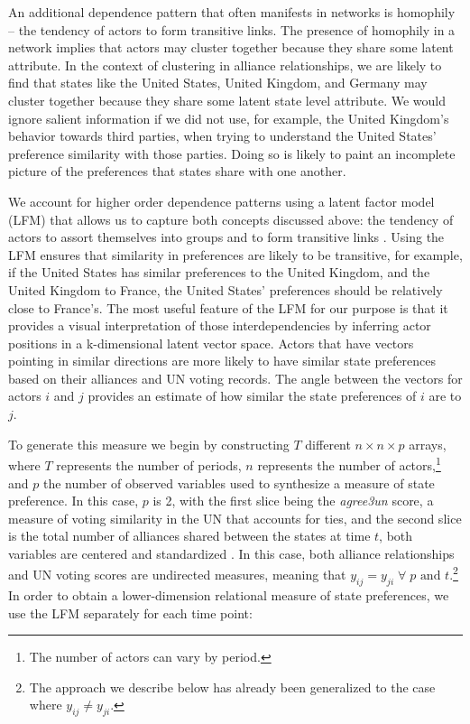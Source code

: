 An additional dependence pattern that often manifests in networks is homophily -- the tendency of actors to form transitive links. The presence of homophily in a network implies that actors may cluster together because they share some latent attribute. In the context of clustering in alliance relationships, we are likely to find that states like the United States, United Kingdom, and Germany may cluster together because they share some latent state level attribute. We would ignore salient information if we did not use, for example, the United Kingdom's behavior towards third parties, when trying to understand the United States' preference similarity with those parties. Doing so is likely to paint an incomplete picture of the preferences that states share with one another.

We account for higher order dependence patterns using a latent factor model (LFM) that allows us to capture both concepts discussed above: the tendency of actors to assort themselves into groups and to form transitive links \citep{hoff:2007,minhas:etal:2016:arxiv}. Using the LFM ensures that similarity in preferences are likely to be transitive, for example, if the United States has similar preferences to the United Kingdom, and the United Kingdom to France, the United States' preferences should be relatively close to France's. The most useful feature of the LFM for our purpose is that it provides a visual interpretation of those interdependencies by inferring actor positions in a k-dimensional latent vector space. Actors that have vectors pointing in similar directions are more likely to have similar state preferences based on their alliances and UN voting records. The angle between the vectors for actors $i$ and $j$ provides an estimate of how similar the state preferences of $i$ are to $j$. 

To generate this measure we begin by constructing $T$ different $n \times n \times p$ arrays, where $T$ represents the number of periods, $n$ represents the number of actors,\footnote{The number of actors can vary by period.} and $p$ the number of observed variables used to synthesize a measure of state preference. In this case, $p$ is 2, with the first slice being the \emph{agree3un} score, a measure of voting similarity in the UN that accounts for ties, and the second slice is the total number of alliances shared between the states at time $t$, both variables are centered and standardized \citep{strezhnev:voeten:2013,gibler:sarkees:2004}. In this case, both alliance relationships and UN voting scores are undirected measures, meaning that $y_{ij} = y_{ji} \; \forall \; p \text{ and } t$.\footnote{The approach we describe below has already been generalized to the case where $y_{ij} \neq y_{ji}$.} In order to obtain a lower-dimension relational measure of state preferences, we use the LFM separately for each time point: 

